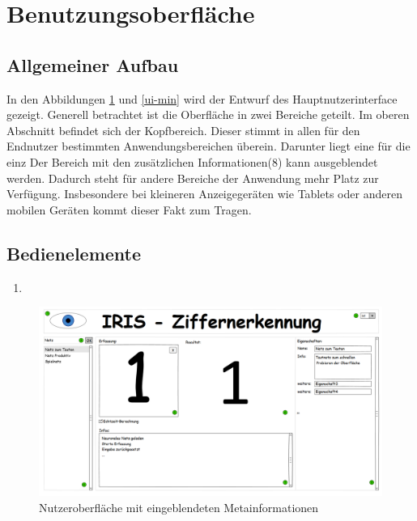 \section{Benutzungsoberfläche}
\subsection{Allgemeiner Aufbau}
 In den Abbildungen \ref{ui-max} und \ref{ui-min} wird der  Entwurf des Hauptnutzerinterface gezeigt. Generell betrachtet ist die Oberfläche in zwei Bereiche geteilt. Im oberen Abschnitt befindet sich der Kopfbereich. Dieser stimmt in allen für den Endnutzer bestimmten Anwendungsbereichen überein. Darunter liegt eine für die einz
 Der Bereich mit den zusätzlichen Informationen(8) kann ausgeblendet werden. Dadurch steht für andere Bereiche der Anwendung mehr Platz zur Verfügung. Insbesondere bei kleineren Anzeigegeräten wie Tablets oder anderen mobilen Geräten kommt dieser Fakt zum Tragen. 
 
 
 
\subsection{Bedienelemente}
 \begin{enumerate}
 	\item 
 \end{enumerate}
 
\begin{figure}[ht]
 
 	\centering
 	\includegraphics[height=0.8\textwidth, angle=90]{Abbildungen/UI-Mocks/Main-Ui.png}
 	\caption{Nutzeroberfläche mit eingeblendeten Metainformationen}
 	\label{ui-max}
\end{figure}

